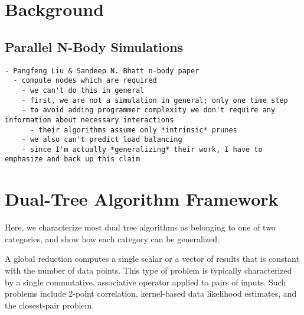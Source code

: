 \documentclass[times, 10pt,twocolumn]{article}
\begin{document}
%
%
%
%
%
%
%
%

\section{Background}

\subsection{Parallel N-Body Simulations}

\begin{verbatim}
- Pangfeng Liu & Sandeep N. Bhatt n-body paper
  - compute nodes which are required
    - we can't do this in general
    - first, we are not a simulation in general; only one time step
    - to avoid adding programmer complexity we don't require any information about necessary interactions
      - their algorithms assume only *intrinsic* prunes
    - we also can't predict load balancing
    - since I'm actually *generalizing* their work, I have to emphasize and back up this claim
\end{verbatim}

\section{Dual-Tree Algorithm Framework}

Here, we characterize most dual tree algorithms as belonging to one of two categories, and show how each category can be generalized.

A global reduction computes a single scalar or a vector of results that is constant with the number of data points.
This type of problem is typically characterized by a single commutative, associative operator applied to pairs of inputs.
Such problems include 2-point correlation, kernel-based data likelihood estimates, and the closest-pair problem.
\end{document}
